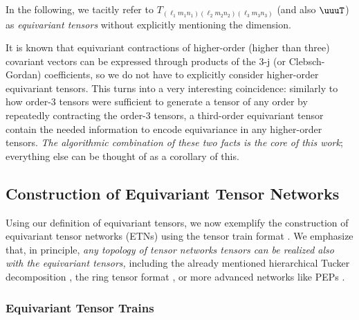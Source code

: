 In the following, we tacitly refer to $T_{(\ell_1 m_1 n_1) (\ell_2 m_2 n_2) (\ell_3 m_3 n_3)}$ (and also $\uuuT$) as \emph{equivariant tensors} without explicitly mentioning the dimension.

It is known that equivariant contractions of higher-order (higher than three) covariant vectors can be expressed through products of the 3-j (or Clebsch-Gordan) coefficients, so we do not have to explicitly consider higher-order equivariant tensors.
This turns into a very interesting coincidence: similarly to how order-3 tensors were sufficient to generate a tensor of any order by repeatedly contracting the order-3 tensors, a third-order equivariant tensor contain the needed information to encode equivariance in any higher-order tensors.
\emph{The algorithmic combination of these two facts is the core of this work}; everything else can be thought of as a corollary of this.

\subsection{Construction of Equivariant Tensor Networks}

Using our definition of equivariant tensors, we now exemplify the construction of equivariant tensor networks (ETNs) using the tensor train format \citep{oseledets_tensortrain_2011}.
We emphasize that, in principle, \emph{any topology of tensor networks tensors can be realized also with the equivariant tensors,} including the already mentioned hierarchical Tucker decomposition \citep{grasedyck_hierarchical_2010}, the ring tensor format \citep{zhao_learning_2019}, or more advanced networks like PEPs \citep{verstraete_renormalization_2004}.


\subsubsection{Equivariant Tensor Trains}

